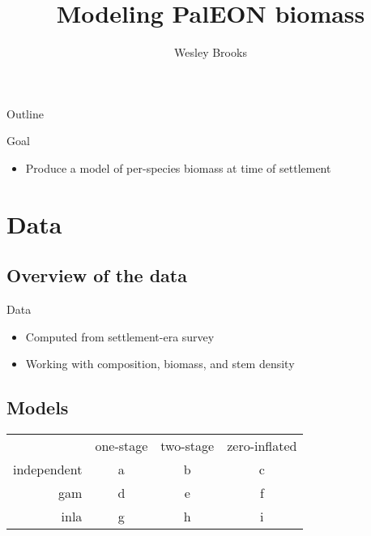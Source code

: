\documentclass{beamer}
\author{Wesley Brooks}
\title{Modeling PalEON biomass}
\institute{UW-Madison}
\begin{document}
\begin{frame}
\titlepage
\end{frame}


\begin{frame}{Outline}
  \tableofcontents
\end{frame}


\begin{frame}{Goal}
  \begin{itemize}
    \item Produce a model of per-species biomass at time of settlement
  \end{itemize}
\end{frame}

\section{Data}
\subsection{Overview of the data}

\begin{frame}{Data}
  \begin{itemize}
    \item Computed from settlement-era survey
    \item Working with composition, biomass, and stem density
  \end{itemize}
\end{frame}


%
\begin{frame}{}
\begin{center}
\end{center}
\end{frame}


\subsection{Models}

\begin{frame}{}
\begin{center}
  \begin{tabular}{rccc}
  & one-stage & two-stage & zero-inflated \\
  independent & a & b & c \\
  gam & d & e & f \\
  inla & g & h & i
  \end{tabular}
\end{center}
\end{frame}
\end{document}
